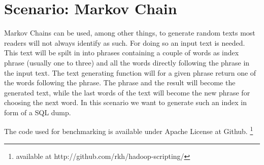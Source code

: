 \section{Scenario: Markov Chain} 

Markov Chains can be used, among other things, to generate random texts most readers will not always identify as such. For doing so an input text is needed. This text will be spilt in into phrases containing a couple of words as index phrase (usually one to three) and all the words directly following the phrase in the input text. The text generating function will for a given phrase return one of the words following the phrase. The phrase and the result will become the generated text, while the last words of the text will become the new phrase for choosing the next word. In this scenario we want to generate such an index in form of a SQL dump.

The code used for benchmarking is available under Apache License at Github. \footnote{available at http://github.com/rkh/hadoop-scripting/}
